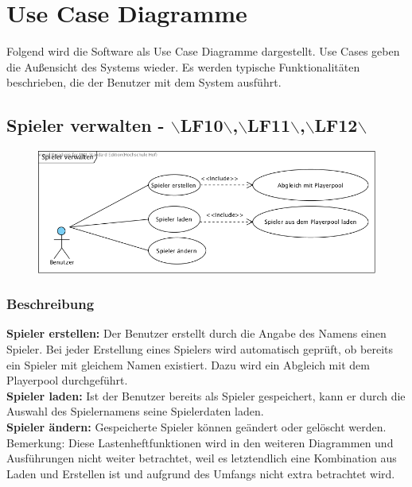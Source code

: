 \clearpage

\chapter{Use Case Diagramme}
Folgend wird die Software als Use Case Diagramme dargestellt. Use Cases geben die Außensicht des Systems wieder. Es werden typische Funktionalitäten beschrieben, die der Benutzer mit dem System ausführt.

\section{Spieler verwalten - $\backslash$LF10$\backslash$,$\backslash$LF11$\backslash$,$\backslash$LF12$\backslash$}
\begin{figure}[!h]
	\centering
    \includegraphics[width=\textwidth]{./SpielerVerwalten.png}
	\label{layout_gesamt}
\end{figure}

\subsection{Beschreibung}
\textbf{Spieler erstellen: }Der Benutzer erstellt durch die Angabe des Namens einen Spieler. Bei jeder Erstellung eines Spielers wird automatisch geprüft, ob bereits ein Spieler mit gleichem Namen existiert. Dazu wird ein Abgleich mit dem Playerpool durchgeführt.\\

\noindent \textbf{Spieler laden: }Ist der Benutzer bereits als Spieler gespeichert, kann er durch die Auswahl des Spielernamens seine Spielerdaten laden.\\

\noindent \textbf{Spieler ändern: } Gespeicherte Spieler können geändert oder gelöscht werden.\\
Bemerkung: Diese Lastenheftfunktionen wird in den weiteren Diagrammen und Ausführungen nicht weiter betrachtet, weil es letztendlich eine Kombination aus Laden und Erstellen ist und aufgrund des Umfangs nicht extra betrachtet wird.


